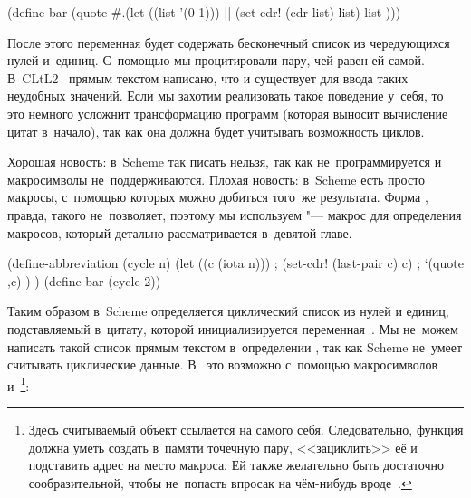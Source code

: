 \begin{code:lisp}
(define bar (quote #.(let ((list '(0 1)))     |\dialect{\CommonLisp}|
                       (set-cdr! (cdr list) list)
                       list )))
\end{code:lisp}

\noindent
После этого переменная  будет содержать бесконечный список из
чередующихся нулей и~единиц. С~помощью  мы процитировали пару, чей
 равен ей самой. В~CLtL2~\cite{ste90} прямым текстом написано, что
 и существует для ввода таких неудобных значений. Если мы захотим
реализовать такое поведение у~себя, то это немного усложнит трансформацию
программ (которая выносит вычисление цитат в~начало), так как она должна будет
учитывать возможность циклов.

Хорошая новость: в~Scheme так писать нельзя, так как 
не~программируется и макросимволы не~поддерживаются. Плохая новость: в~Scheme
есть просто макросы, с~помощью которых можно добиться того~же результата. Форма
, правда, такого не~позволяет, поэтому мы используем
 "--- макрос для определения макросов, который детально
рассматривается в~девятой главе. 

\begin{code:lisp}
(define-abbreviation (cycle n)
  (let ((c (iota n)))           ;  {\is} 
    (set-cdr! (last-pair c) c)  ;  {\is} 
    `(quote ,c) ) )
(define bar (cycle 2))
\end{code:lisp}

Таким образом в~Scheme определяется циклический список из нулей и единиц,
подставляемый в~цитату, которой инициализируется переменная~. Мы
не~можем написать такой список прямым текстом в~определении , так как
 Scheme не~умеет считывать циклические данные. В~{\CommonLisp} это
возможно с~помощью макросимволов  и~\footnote{Здесь
считываемый объект ссылается на самого себя. Следовательно, функция 
должна уметь создать в~памяти точечную пару, <<зациклить>> её и подставить адрес
на место макроса. Ей также желательно быть достаточно сообразительной, чтобы
не~попасть впросак на чём-нибудь вроде~.}:


